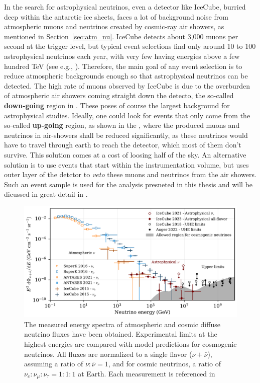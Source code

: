 In the search for astrophysical neutrinos, even a detector like IceCube, burried deep within the antarctic ice sheets, faces a lot of background noise from atmospheric muons and neutrinos created by cosmic-ray air showers, as mentioned in Section~\ref{sec:atm_nu}. IceCube detects about 3,000 muons per second at the trigger level, but typical event selections find only around 10 to 100 astrophysical neutrinos each year, with very few having energies above a few hundred TeV (see e.g., ). Therefore, the main goal of any event selection is to reduce atmospheric backgrounds enough so that astrophysical neutrinos can be detected. The high rate of muons observed by IceCube is due to the overburden of atmospheric air showers coming straight down the detecto, the so-called \textbf{down-going} region in . These poses of course the largest background for astrophysical studies. Ideally, one could look for events that only come from the so-called \textbf{up-going} region, as shown in the , where the produced muons and neutrinos in air-showers shall be reduced significantly, as these neutrinos would have to travel through earth to reach the detector, which most of them don't survive. This solution comes at a cost of loosing half of the sky. An alternative solution is to use events that start within the instrumentation volume, but uses outer layer of the detctor to \emph{veto} these muons and neutrinos from the air showers. Such an event sample is used for the analysis presneted in this thesis and will be dicussed in great detail in .

\begin{figure}[h!]
    \caption{The measured energy spectra of atmospheric and cosmic diffuse neutrino fluxes have been obtained. Experimental limits at the highest energies are compared with model predictions for cosmogenic neutrinos. All fluxes are normalized to a single flavor ($\nu + \bar{\nu}$), assuming a ratio of $\nu : \bar{\nu} = 1$, and for cosmic neutrinos, a ratio of $\nu_e : \nu_\mu : \nu_\tau = 1 : 1 : 1$ at Earth. Each measurement is referenced in \cite{PDG_2024}}
    \includegraphics{./figures/nu_he/neutrino_spectrum_wide_231010.pdf}
\end{figure}

